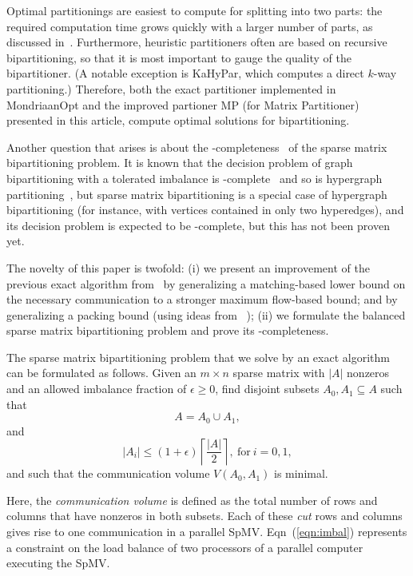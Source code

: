 Optimal partitionings are easiest to compute for splitting into two parts:
the required computation time
grows quickly with a larger number of parts, as discussed in~\cite{pelt15}.
Furthermore, heuristic partitioners often are based on recursive bipartitioning,
so that it is most important to gauge the quality of the bipartitioner.
(A notable exception is KaHyPar, which computes a direct $k$-way partitioning.)
Therefore, both the exact partitioner implemented in MondriaanOpt and the improved partioner 
MP (for Matrix Partitioner)
presented in this article, compute optimal solutions for bipartitioning.

Another question that arises is about the \NP-completeness~\cite{garey79}
of the sparse matrix bipartitioning problem.
It is known that the decision problem of
graph bipartitioning with a tolerated imbalance
is \NP-complete~\cite[Theorem 3.1]{bui92}
and so is hypergraph partitioning~\cite[Chapter 6]{lengauer90}, 
but sparse matrix bipartitioning is a special
case of hypergraph bipartitioning (for instance, with vertices contained in only two hyperedges),
and its decision problem is expected to be \NP-complete,
but this has not been proven yet.

The novelty of this paper is twofold: (i) we present an improvement
of the previous exact algorithm from~\cite{pelt15} by generalizing
a matching-based lower bound on the necessary communication
to a stronger maximum flow-based bound; and by generalizing a packing
bound (using ideas from ~\cite{delling14}); (ii) we formulate the balanced sparse matrix bipartitioning problem
and prove its \NP-completeness.

The sparse matrix bipartitioning problem that
we solve by an exact algorithm can be formulated as follows.
Given an $m \times n$ sparse matrix with $|A|$ nonzeros
and an allowed imbalance fraction of $\epsilon \geq 0$,
find disjoint subsets $A_0, A_1 \subseteq A$ such that
\begin{equation}
A=A_0 \cup A_1,
\end{equation}
and
\begin{equation}
\label{eqn:imbal}
|A_i| \leq (1+\epsilon ) \left\lceil \frac{|A|}{2} \right\rceil ,
~\mathrm{for}~ i=0,1,
\end{equation}
and such that the communication volume $V(A_0,A_1)$ is minimal.

Here, the \emph{communication volume} is
defined as the total number of rows and columns 
that have nonzeros in both subsets.
Each of these \emph{cut} rows and columns gives rise to one communication
in a parallel SpMV.
Eqn~(\ref{eqn:imbal}) represents a constraint on the load balance
of two processors of a parallel computer executing the SpMV. 


